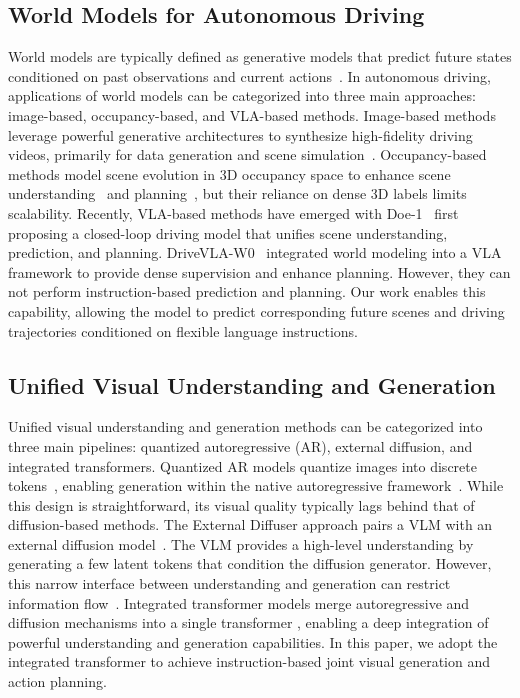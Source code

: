 \subsection{World Models for Autonomous Driving}
\label{sec: related_work_world_model}
World models are typically defined as generative models that predict future states conditioned on past observations and current actions~\cite{world-models}. 
In autonomous driving, applications of world models can be categorized into three main approaches: image-based, occupancy-based, and VLA-based methods. Image-based methods leverage powerful generative architectures to synthesize high-fidelity driving videos, primarily for data generation and scene simulation~\cite{gaia-1, gaia-2, drivedreamer-1, drivedreamer-2, vista, drive-wm}. 
Occupancy-based methods model scene evolution in 3D occupancy space to enhance scene understanding~\cite{occllama, driveworld, gaussianworld} and planning~\cite{occworld, occllama, drive-occworld, preworld}, but their reliance on dense 3D labels limits scalability. 
Recently, VLA-based methods have emerged with Doe-1~\cite{doe-1} first proposing a closed-loop driving model that unifies scene understanding, prediction, and planning. 
DriveVLA-W0~\cite{drivevla-w0} integrated world modeling into a VLA framework to provide dense supervision and enhance planning. 
However, they can not perform instruction-based prediction and planning. 
Our work enables this capability, allowing the model to predict corresponding future scenes and driving trajectories conditioned on flexible language instructions.

\subsection{Unified Visual Understanding and Generation}
\label{sec: related_work_unifed}
Unified visual understanding and generation methods can be categorized into three main pipelines: quantized autoregressive (AR), external diffusion, and integrated transformers. 
Quantized AR models quantize images into discrete tokens~\cite{argen, vqgen}, enabling generation within the native autoregressive framework~\cite{janus, janus-pro, unified-io-2, tokenflow, liquid, vila-u, chameleon, emu3}. 
While this design is straightforward, its visual quality typically lags behind that of diffusion-based methods. 
The External Diffuser approach pairs a VLM with an external diffusion model~\cite{dreamllm, seed-x, emu2, metamorph}. 
The VLM provides a high-level understanding by generating a few latent tokens that condition the diffusion generator. 
However, this narrow interface between understanding and generation can restrict information flow~\cite{bagel}. 
Integrated transformer models merge autoregressive and diffusion mechanisms into a single transformer \cite{janusflow, llamafusion, transfusion_diffuse, bagel, MoT}, enabling a deep integration of powerful understanding and generation capabilities. 
In this paper, we adopt the integrated transformer to achieve instruction-based joint visual generation and action planning.

